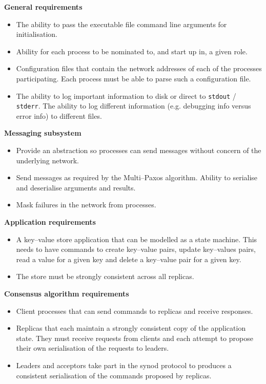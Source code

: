 \textbf{General requirements}
\begin{itemize}
  \item The ability to pass the executable file command line arguments for initialisation.
  \item Ability for each process to be nominated to, and start up in, a given role.
  \item Configuration files that contain the network addresses of each of the processes participating. Each process must be able to parse such a configuration file.
  \item The ability to log important information to disk or direct to \texttt{stdout} / \texttt{stderr}. The ability to log different information (e.g. debugging info versus error info) to different files.
\end{itemize}

\textbf{Messaging subsystem}
\begin{itemize}
  \item Provide an abstraction so processes can send messages without concern of the underlying network.
  \item Send messages as required by the Multi--Paxos algorithm. Ability to serialise and deserialise arguments and results.
  \item Mask failures in the network from processes.
\end{itemize}

\textbf{Application requirements}
\begin{itemize}
  \item A key--value store application that can be modelled as a state machine. This needs to have commands to create key--value pairs, update key--values pairs, read a value for a given key and delete a key--value pair for a given key.
  \item The store must be strongly consistent across all replicas.
\end{itemize}

\textbf{Consensus algorithm requirements}
\begin{itemize}
  \item Client processes that can send commands to replicas and receive responses.
  \item Replicas that each maintain a strongly consistent copy of the application state. They must receive requests from clients and each attempt to propose their own serialisation of the requests to leaders.
  \item Leaders and acceptors take part in the synod protocol to produces a consistent serialisation of the commands proposed by replicas.
\end{itemize}


